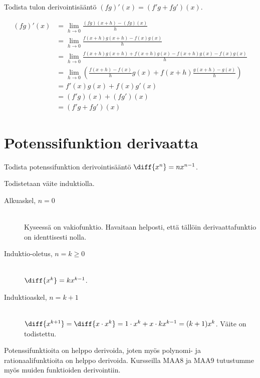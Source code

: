\begin{esimerkki}
	Todista tulon derivointisääntö $(fg)'(x) = (f'g+fg')(x)$.
	\begin{esimratk}
		\begin{align*}
			(fg)'(x) &= \lim\limits_{h \to 0} \frac{(fg)(x+h)-(fg)(x)}{h} \\
					 &= \lim\limits_{h \to 0} \frac{f(x+h)g(x+h)-f(x)g(x)}{h} \\
					 &= \lim\limits_{h \to 0} \frac{f(x+h)g(x+h)+f(x+h)g(x)-f(x+h)g(x)-f(x)g(x)}{h} \\
					 &= \lim\limits_{h \to 0} (\frac{f(x+h)-f(x)}{h} g(x) + f(x+h) \frac{g(x+h)-g(x)}{h}) \\
					 &= f'(x)g(x) + f(x)g'(x) \\
					 &= (f'g)(x) + (fg')(x) \\
					 &= (f'g + fg')(x)
		\end{align*}
	\end{esimratk}
\end{esimerkki}

\section{Potenssifunktion derivaatta}


\begin{esimerkki}
	Todista potenssifunktion derivointisääntö $\diff{x^n} = nx^{n-1}$.
	\begin{esimratk}
		Todistetaan väite induktiolla.
		\begin{description}
			\item[Alkuaskel, $n=0$] \hfill \\
			Kyseessä on vakiofunktio. Havaitaan helposti, että tällöin derivaattafunktio on identtisesti nolla.
			\item[Induktio-oletus, $n=k\geq0$] \hfill \\
			$\diff{x^k} = kx^{k-1}$.
			\item[Induktioaskel, $n=k+1$] \hfill \\
			$\diff{x^{k+1}} = \diff{x \cdot x^k} = 1 \cdot x^k + x \cdot kx^{k-1} = (k+1)x^k$. Väite on todistettu.
		\end{description}
	\end{esimratk}
\end{esimerkki}

Potenssifunktioita on helppo derivoida, joten myös polynomi- ja rationaalifunktioita on helppo derivoida.
Kursseilla MAA8 ja MAA9 tutustumme myös muiden funktioiden derivointiin.

